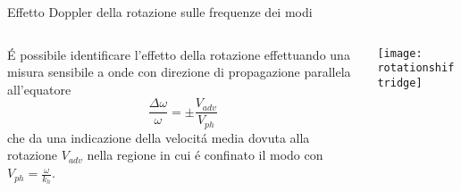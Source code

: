 \begin{frame}{Effetto Doppler della rotazione sulle frequenze dei modi}

\begin{columns}

\begin{column}{0.5\textwidth}

\'E possibile identificare l'effetto della rotazione effettuando una misura sensibile a onde con direzione di propagazione parallela all'equatore
\begin{equation}
\frac{\Delta\omega}{\omega}=\pm\frac{V_{adv}}{V_{ph}}
\end{equation}
che da una indicazione della velocit\'a media dovuta alla rotazione $V_{adv}$ nella regione in cui \'e confinato il modo con $V_{ph}=\frac{\omega}{k_h}$.

\end{column}

\begin{column}{0.5\textwidth}

\begin{minipage}{0.9\textwidth}
\label{fig:rotationshiftridge}
\end{minipage}

\begin{minipage}{0.9\textwidth}
\texttt{[image: rotationshiftridge]}
\end{minipage}

\end{column}

\end{columns}

\end{frame}


